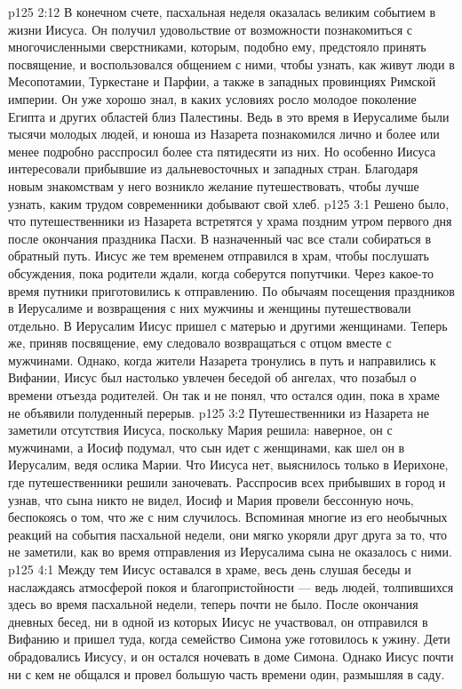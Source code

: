 \vs p125 2:12 В конечном счете, пасхальная неделя оказалась великим событием в жизни Иисуса. Он получил удовольствие от возможности познакомиться с многочисленными сверстниками, которым, подобно ему, предстояло принять посвящение, и воспользовался общением с ними, чтобы узнать, как живут люди в Месопотамии, Туркестане и Парфии, а также в западных провинциях Римской империи. Он уже хорошо знал, в каких условиях росло молодое поколение Египта и других областей близ Палестины. Ведь в это время в Иерусалиме были тысячи молодых людей, и юноша из Назарета познакомился лично и более или менее подробно расспросил более ста пятидесяти из них. Но особенно Иисуса интересовали прибывшие из дальневосточных и западных стран. Благодаря новым знакомствам у него возникло желание путешествовать, чтобы лучше узнать, каким трудом современники добывают свой хлеб.
\vs p125 3:1 Решено было, что путешественники из Назарета встретятся у храма поздним утром первого дня после окончания праздника Пасхи. В назначенный час все стали собираться в обратный путь. Иисус же тем временем отправился в храм, чтобы послушать обсуждения, пока родители ждали, когда соберутся попутчики. Через какое\hyp{}то время путники приготовились к отправлению. По обычаям посещения праздников в Иерусалиме и возвращения с них мужчины и женщины путешествовали отдельно. В Иерусалим Иисус пришел с матерью и другими женщинами. Теперь же, приняв посвящение, ему следовало возвращаться с отцом вместе с мужчинами. Однако, когда жители Назарета тронулись в путь и направились к Вифании, Иисус был настолько увлечен беседой об ангелах, что позабыл о времени отъезда родителей. Он так и не понял, что остался один, пока в храме не объявили полуденный перерыв.
\vs p125 3:2 Путешественники из Назарета не заметили отсутствия Иисуса, поскольку Мария решила: наверное, он с мужчинами, а Иосиф подумал, что сын идет с женщинами, как шел он в Иерусалим, ведя ослика Марии. Что Иисуса нет, выяснилось только в Иерихоне, где путешественники решили заночевать. Расспросив всех прибывших в город и узнав, что сына никто не видел, Иосиф и Мария провели бессонную ночь, беспокоясь о том, что же с ним случилось. Вспоминая многие из его необычных реакций на события пасхальной недели, они мягко укоряли друг друга за то, что не заметили, как во время отправления из Иерусалима сына не оказалось с ними.
\vs p125 4:1 Между тем Иисус оставался в храме, весь день слушая беседы и наслаждаясь атмосферой покоя и благопристойности --- ведь людей, толпившихся здесь во время пасхальной недели, теперь почти не было. После окончания дневных бесед, ни в одной из которых Иисус не участвовал, он отправился в Вифанию и пришел туда, когда семейство Симона уже готовилось к ужину. Дети обрадовались Иисусу, и он остался ночевать в доме Симона. Однако Иисус почти ни с кем не общался и провел большую часть времени один, размышляя в саду.
